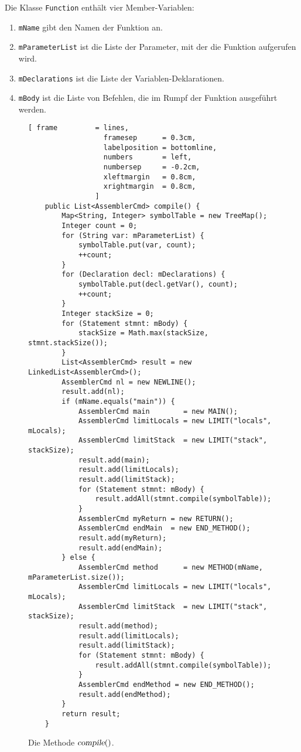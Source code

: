 Die Klasse \texttt{Function} enth\"alt vier Member-Variablen:
\begin{enumerate}
\item \texttt{mName} gibt den Namen der Funktion an.
\item \texttt{mParameterList} ist die Liste der Parameter, 
      mit der die Funktion aufgerufen wird.
\item \texttt{mDeclarations} ist die Liste der Variablen-Deklarationen.
\item \texttt{mBody} ist die Liste von Befehlen, die im Rumpf der Funktion
      ausgef\"uhrt werden.
\end{enumerate}

\begin{figure}[!ht]
\centering
\begin{Verbatim}[ frame         = lines, 
                  framesep      = 0.3cm, 
                  labelposition = bottomline,
                  numbers       = left,
                  numbersep     = -0.2cm,
                  xleftmargin   = 0.8cm,
                  xrightmargin  = 0.8cm,
                ]
    public List<AssemblerCmd> compile() {
        Map<String, Integer> symbolTable = new TreeMap();
        Integer count = 0;
        for (String var: mParameterList) {
            symbolTable.put(var, count);
            ++count;
        }
        for (Declaration decl: mDeclarations) {
            symbolTable.put(decl.getVar(), count);
            ++count;
        }
        Integer stackSize = 0;
        for (Statement stmnt: mBody) {
            stackSize = Math.max(stackSize, stmnt.stackSize());
        }
        List<AssemblerCmd> result = new LinkedList<AssemblerCmd>();
        AssemblerCmd nl = new NEWLINE();
        result.add(nl);
        if (mName.equals("main")) {
            AssemblerCmd main        = new MAIN();
            AssemblerCmd limitLocals = new LIMIT("locals", mLocals);
            AssemblerCmd limitStack  = new LIMIT("stack", stackSize);
            result.add(main);
            result.add(limitLocals);
            result.add(limitStack);
            for (Statement stmnt: mBody) {
                result.addAll(stmnt.compile(symbolTable));
            }
            AssemblerCmd myReturn = new RETURN();
            AssemblerCmd endMain  = new END_METHOD();
            result.add(myReturn);
            result.add(endMain);
        } else {
            AssemblerCmd method      = new METHOD(mName, mParameterList.size());
            AssemblerCmd limitLocals = new LIMIT("locals", mLocals);
            AssemblerCmd limitStack  = new LIMIT("stack", stackSize);
            result.add(method);
            result.add(limitLocals);
            result.add(limitStack);
            for (Statement stmnt: mBody) {
                result.addAll(stmnt.compile(symbolTable));
            }
            AssemblerCmd endMethod = new END_METHOD();
            result.add(endMethod);
        }
        return result;
    }
\end{Verbatim}
\vspace*{-0.3cm}
\caption{Die Methode $\textsl{compile}()$.}
\label{fig:Compiler:Function.compile}
\end{figure}

